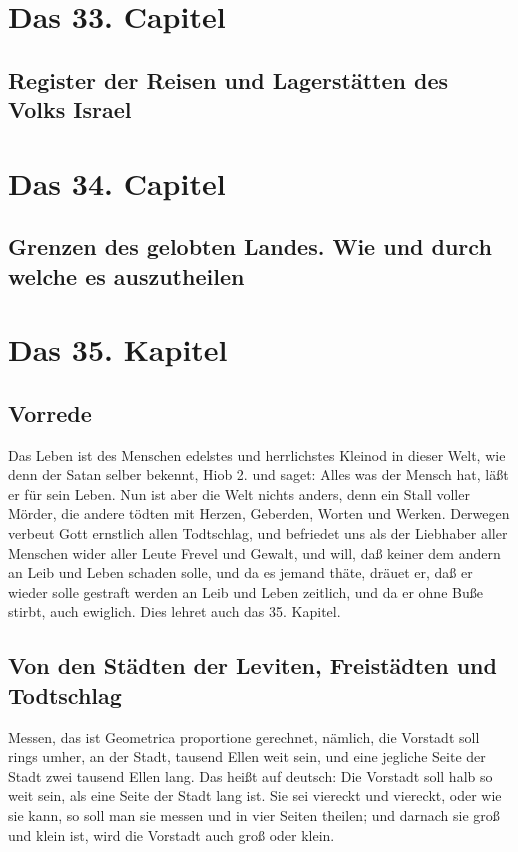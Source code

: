 \chapter{Das 33. Capitel}

\section{Register der Reisen und Lagerstätten des Volks Israel}

\chapter{Das 34. Capitel}

\section[Grenzen des gelobten Landes. Wie und durch welche]{Grenzen des gelobten Landes. Wie und durch welche es auszutheilen}

\chapter{Das 35. Kapitel}

\section{Vorrede}

Das Leben ist des Menschen edelstes und herrlichstes Kleinod in dieser Welt, wie denn der Satan selber bekennt, Hiob 2. und saget: Alles was der Mensch hat, läßt er für sein Leben. Nun ist aber die Welt nichts anders, denn ein Stall voller Mörder, die andere tödten mit Herzen, Geberden, Worten und Werken. Derwegen verbeut Gott ernstlich allen Todtschlag, und befriedet uns als der Liebhaber aller Menschen wider aller Leute Frevel und Gewalt, und will, daß keiner dem andern an Leib und Leben schaden solle, und da es jemand thäte, dräuet er, daß er wieder solle gestraft werden an Leib und Leben zeitlich, und da er ohne Buße stirbt, auch ewiglich. Dies lehret auch das 35. Kapitel.

\section{Von den Städten der Leviten, Freistädten und Todtschlag}

Messen, das ist Geometrica proportione gerechnet, nämlich, die Vorstadt soll rings umher, an der Stadt, tausend Ellen weit sein, und eine jegliche Seite der Stadt zwei tausend Ellen lang. Das heißt auf deutsch: Die Vorstadt soll halb so weit sein, als eine Seite der Stadt lang ist. Sie sei viereckt und viereckt, oder wie sie kann, so soll man sie messen und in vier Seiten theilen; und darnach sie groß und klein ist, wird die Vorstadt auch groß oder klein.

